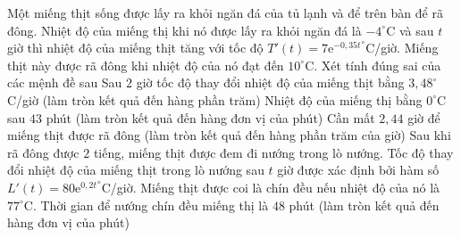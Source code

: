 \begin{ex}%
Một miếng thịt sống được lấy ra khỏi ngăn đá của tủ lạnh và để trên bàn để rã đông. Nhiệt độ của miếng thị khi nó được lấy ra khỏi ngăn đá là $-4^\circ$C và sau $t$ giờ thì nhiệt độ của miếng thịt tăng với tốc độ $T'(t)=7{\mathrm{e}^{-0{,}35t}}^\circ$C/giờ. Miếng thịt này được rã đông khi nhiệt độ của nó đạt đến $10^\circ$C. Xét tính đúng sai của các mệnh đề sau
\choiceTF
{\True Sau $2$ giờ tốc độ thay đổi nhiệt độ của miếng thịt bằng $3{,}48^\circ$C/giờ (làm tròn kết quả đến hàng phần trăm)}
{Nhiệt độ của miếng thị bằng $0^\circ$C sau $43$ phút (làm tròn kết quả đến hàng đơn vị của phút)}
{Cần mất $2{,}44$ giờ để miếng thịt được rã đông (làm tròn kết quả đến hàng phần trăm của giờ)}
{Sau khi rã đông được $2$ tiếng, miếng thịt được đem đi nướng trong lò nướng. Tốc độ thay đổi nhiệt độ của miếng thịt trong lò nướng sau $t$ giờ được xác định bởi hàm số $L'(t)=80{\mathrm{e}^{0{,}2t}}^\circ$C/giờ. Miếng thịt được coi là chín đều nếu nhiệt độ của nó là $77^\circ$C. Thời gian để nướng chín đều miếng thị là $48$ phút (làm tròn kết quả đến hàng đơn vị của phút)}
\end{ex}
